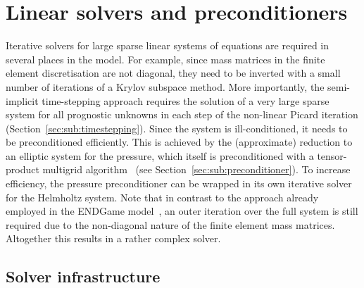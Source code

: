 \documentclass[review,times]{elsarticle}
\begin{document}
\section{\label{sec:Solver}Linear solvers and preconditioners}

Iterative solvers for large sparse linear systems of equations are
required in several places in the model. For example, since mass
matrices in the finite element discretisation are not diagonal, they
need to be inverted with a small number of iterations of a Krylov
subspace method. More importantly, the semi-implicit time-stepping
approach requires the solution of a very large sparse system for all
prognostic unknowns in each step of the non-linear Picard
iteration (Section~\ref{sec:sub:timestepping}). 
Since the system is ill-conditioned, it needs to be
preconditioned efficiently. This is achieved by the (approximate)
reduction to an elliptic system for the pressure, which itself is
preconditioned with a tensor-product multigrid algorithm~\cite{Borm2001} 
(see Section~\ref{sec:sub:preconditioner}). To increase
efficiency, the pressure preconditioner can be wrapped in its own
iterative solver for the Helmholtz system. Note that in contrast to
the approach already employed in the ENDGame model~\cite{QJ:QJ2235},
an outer iteration over the full system is still required due to the
non-diagonal nature of the finite element mass matrices. Altogether
this results in a rather complex solver.

\subsection{\label{sec:sub:solvinf}Solver infrastructure}
\end{document}
